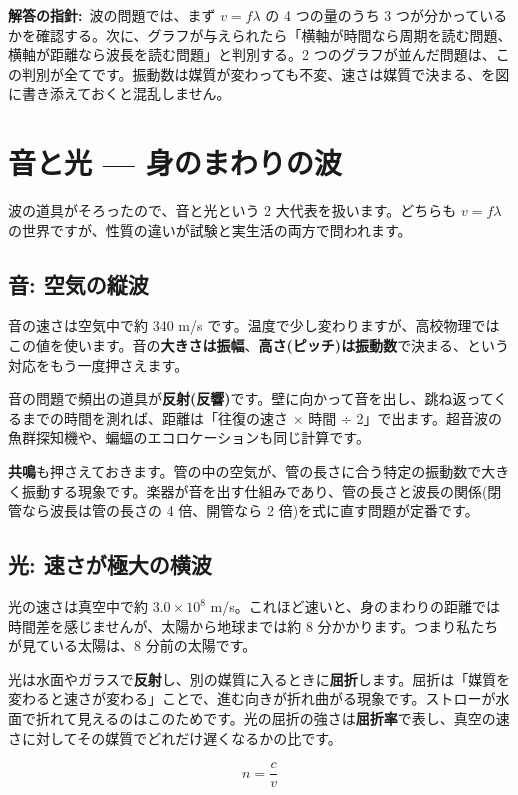 \documentclass{article}
\begin{document}
\textbf{解答の指針:}\ 波の問題では、まず \( v = f\lambda \) の 4 つの量のうち 3 つが分かっているかを確認する。次に、グラフが与えられたら「横軸が時間なら周期を読む問題、横軸が距離なら波長を読む問題」と判別する。2 つのグラフが並んだ問題は、この判別が全てです。振動数は媒質が変わっても不変、速さは媒質で決まる、を図に書き添えておくと混乱しません。

\section{音と光 — 身のまわりの波}

波の道具がそろったので、音と光という 2 大代表を扱います。どちらも \( v = f\lambda \) の世界ですが、性質の違いが試験と実生活の両方で問われます。

\subsection{音: 空気の縦波}

音の速さは空気中で約 340 m/s です。温度で少し変わりますが、高校物理ではこの値を使います。音の\textbf{大きさは振幅}、\textbf{高さ(ピッチ)は振動数}で決まる、という対応をもう一度押さえます。

音の問題で頻出の道具が\textbf{反射(反響)}です。壁に向かって音を出し、跳ね返ってくるまでの時間を測れば、距離は「往復の速さ × 時間 ÷ 2」で出ます。超音波の魚群探知機や、蝙蝠のエコロケーションも同じ計算です。

\textbf{共鳴}も押さえておきます。管の中の空気が、管の長さに合う特定の振動数で大きく振動する現象です。楽器が音を出す仕組みであり、管の長さと波長の関係(閉管なら波長は管の長さの 4 倍、開管なら 2 倍)を式に直す問題が定番です。

\subsection{光: 速さが極大の横波}

光の速さは真空中で約 \( 3.0 \times 10^{8} \) m/s。これほど速いと、身のまわりの距離では時間差を感じませんが、太陽から地球までは約 8 分かかります。つまり私たちが見ている太陽は、8 分前の太陽です。

光は水面やガラスで\textbf{反射}し、別の媒質に入るときに\textbf{屈折}します。屈折は「媒質を変わると速さが変わる」ことで、進む向きが折れ曲がる現象です。ストローが水面で折れて見えるのはこのためです。光の屈折の強さは\textbf{屈折率}で表し、真空の速さに対してその媒質でどれだけ遅くなるかの比です。

\[ n = \frac{c}{v} \]
\end{document}
